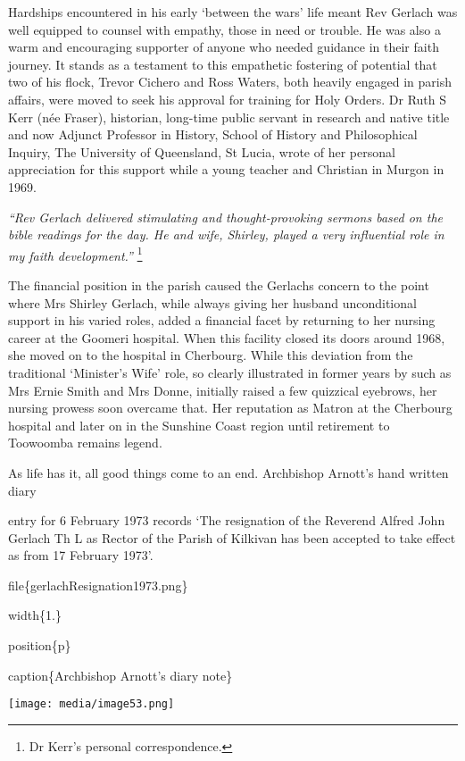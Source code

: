 Hardships encountered in his early `between the wars' life meant Rev Gerlach was well equipped to counsel with empathy, those in need or trouble. He was also a warm and encouraging supporter of anyone who needed guidance in their faith journey. It stands as a testament to this empathetic fostering of potential that two of his flock, Trevor Cichero and Ross Waters, both heavily engaged in parish affairs, were moved to seek his approval for training for Holy Orders. Dr Ruth S Kerr (née Fraser), historian, long-time public servant in research and native title and now Adjunct Professor in History, School of History and Philosophical Inquiry, The University of Queensland, St Lucia, wrote of her personal appreciation for this support while a young teacher and Christian in Murgon in 1969.

\emph{``Rev Gerlach delivered stimulating and thought-provoking sermons based on the bible readings for the day. He and wife, Shirley, played a very influential role in my faith development.''} \footnote{Dr Kerr's personal correspondence.}

The financial position in the parish caused the Gerlachs concern to the point where Mrs Shirley Gerlach, while always giving her husband unconditional support in his varied roles, added a financial facet by returning to her nursing career at the Goomeri hospital. When this facility closed its doors around 1968, she moved on to the hospital in Cherbourg. While this deviation from the traditional `Minister's Wife' role, so clearly illustrated in former years by such as Mrs Ernie Smith and Mrs Donne, initially raised a few quizzical eyebrows, her nursing prowess soon overcame that. Her reputation as Matron at the Cherbourg hospital and later on in the Sunshine Coast region until retirement to Toowoomba remains legend.

As life has it, all good things come to an end. Archbishop Arnott's hand written diary

entry for 6 February 1973 records `The resignation of the Reverend Alfred John Gerlach Th L as Rector of the Parish of Kilkivan has been accepted to take effect as from 17 February 1973'.

file\{gerlachResignation1973.png\}

width\{1.\}

position\{p\}

caption\{Archbishop Arnott's diary note\}

\texttt{[image: media/image53.png]}


